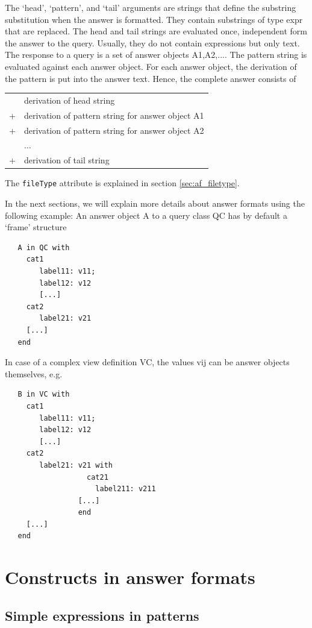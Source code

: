 The `head', `pattern', and `tail' arguments are strings that define the substring substitution when the answer is formatted. They contain substrings of
type {expr} that are replaced. The head and tail strings are evaluated once, independent form the answer to the query. Usually, they do not
contain expressions but only text. The response to a query is a set of answer objects {A1,A2,...}. The pattern string is evaluated against each
answer object. For each answer object, the derivation of the pattern is put into the answer text. Hence, the complete answer consists of

\begin{tabular}{rl}
   &  derivation of head string \\
   + & derivation of pattern string for answer object A1 \\
   + & derivation of pattern string for answer object A2 \\
   &     $\ldots$ \\
   + & derivation of tail string \\
\end{tabular}

The {\tt fileType} attribute is explained in section \ref{sec:af_filetype}.

In the next sections, we will explain more details about answer formats using the following example:
An answer object A to a query class QC has by default a `frame' structure

\begin{verbatim}
   A in QC with
     cat1
        label11: v11;
        label12: v12
        [...]
     cat2
        label21: v21
     [...]
   end
\end{verbatim}

In case of a complex view definition VC, the values vij can be answer objects themselves, e.g.

\begin{verbatim}
   B in VC with
     cat1
        label11: v11;
        label12: v12
        [...]
     cat2
        label21: v21 with
                   cat21
                     label211: v211
                 [...]
                 end
     [...]
   end
\end{verbatim}

\section{Constructs in answer formats}

\subsection{Simple expressions in patterns}

